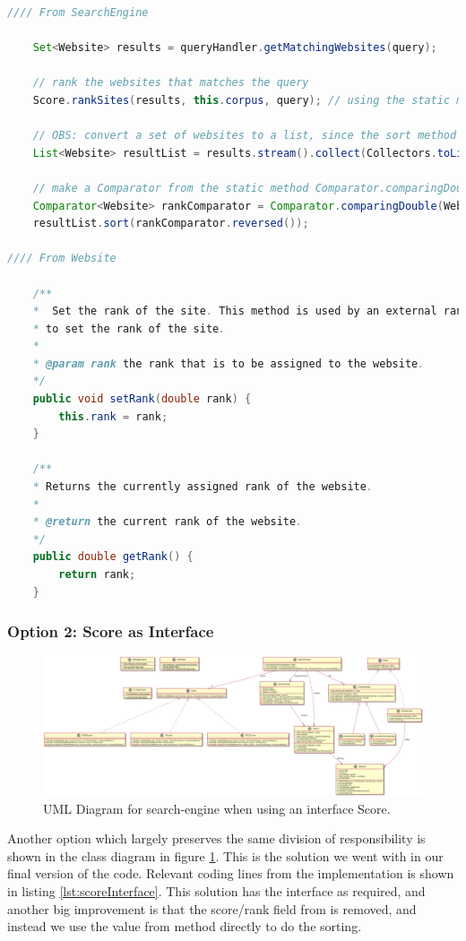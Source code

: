 \begin{lstlisting}[language=Java, caption=This is a code example., label=lst:ScoreUtilityClass-2]
//// From SearchEngine 

	Set<Website> results = queryHandler.getMatchingWebsites(query);
	
	// rank the websites that matches the query
	Score.rankSites(results, this.corpus, query); // using the static method Score.rankSites.
	
	// OBS: convert a set of websites to a list, since the sort method only works for list.
	List<Website> resultList = results.stream().collect(Collectors.toList());  
	
	// make a Comparator from the static method Comparator.comparingDouble()
	Comparator<Website> rankComparator = Comparator.comparingDouble(Website::getRank);
	resultList.sort(rankComparator.reversed()); 

//// From Website

	/**
	*  Set the rank of the site. This method is used by an external ranking method
	* to set the rank of the site. 
	* 
	* @param rank the rank that is to be assigned to the website.  
	*/
	public void setRank(double rank) {
		this.rank = rank;
	}

	/**
	* Returns the currently assigned rank of the website. 
	* 
	* @return the current rank of the website. 
	*/
	public double getRank() {
		return rank;
	}
\end{lstlisting}


\subsubsection{Option 2: Score as Interface}
\begin{figure}
	\centering
	\includegraphics[width=\textwidth]{graphics/uml/ScoreAsInterface.png}
	\caption{UML Diagram for search-engine when using an interface Score.}
	\label{fig:uml:ScoreAsInterface}
\end{figure}
Another option which largely preserves the same division of responsibility is shown in the class diagram in figure \ref{fig:uml:ScoreAsInterface}. This is the solution we went with in our final version of the code. Relevant coding lines from the implementation is shown in listing \ref{lst:scoreInterface}.
This solution has the  interface as required, and another big improvement is that the score/rank field from  is removed, and instead we use the value from  method directly to do the sorting.  



